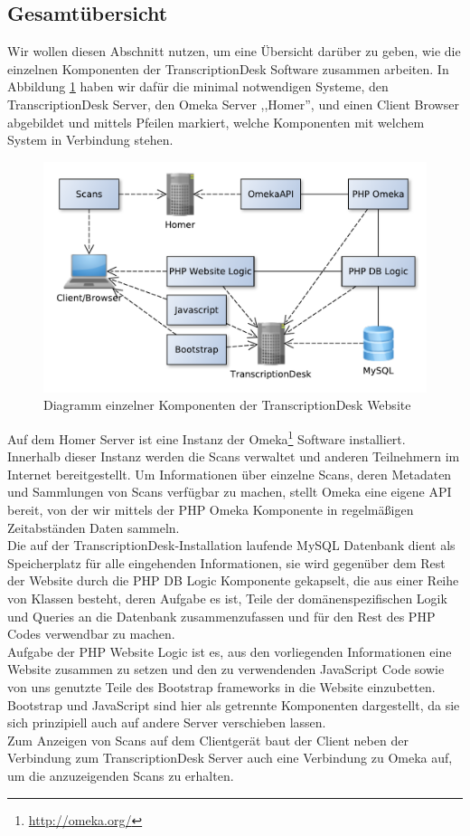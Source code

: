 \documentclass{article}
\begin{document}
\subsection{Gesamtübersicht}
Wir wollen diesen Abschnitt nutzen, um eine Übersicht darüber zu geben,
wie die einzelnen Komponenten der TranscriptionDesk Software zusammen arbeiten.
In Abbildung \ref{fig:components} haben wir dafür die minimal notwendigen Systeme,
den TranscriptionDesk Server, den Omeka Server ,,Homer'', und einen Client Browser abgebildet
und mittels Pfeilen markiert, welche Komponenten mit welchem System in Verbindung stehen.
\\\begin{figure}[H]
\includegraphics[width=\textwidth]{../notes/components.pdf}
\caption{Diagramm einzelner Komponenten der TranscriptionDesk Website}
\label{fig:components}
\end{figure}
Auf dem Homer Server ist eine Instanz der Omeka\footnote{\url{http://omeka.org/}} Software installiert.
Innerhalb dieser Instanz werden die Scans verwaltet und anderen Teilnehmern im Internet bereitgestellt.
Um Informationen über einzelne Scans, deren Metadaten und Sammlungen von Scans verfügbar zu machen,
stellt Omeka eine eigene API bereit, von der wir mittels der PHP Omeka Komponente in regelmäßigen Zeitabständen Daten sammeln.\\
Die auf der TranscriptionDesk-Installation laufende MySQL Datenbank dient als Speicherplatz für alle eingehenden Informationen,
sie wird gegenüber dem Rest der Website durch die PHP DB Logic Komponente gekapselt,
die aus einer Reihe von Klassen besteht, deren Aufgabe es ist,
Teile der domänenspezifischen Logik und Queries an die Datenbank zusammenzufassen
und für den Rest des PHP Codes verwendbar zu machen.\\
Aufgabe der PHP Website Logic ist es, aus den vorliegenden Informationen eine Website zusammen zu setzen
und den zu verwendenden JavaScript Code sowie von uns genutzte Teile des Bootstrap frameworks in die Website einzubetten.
Bootstrap und JavaScript sind hier als getrennte Komponenten dargestellt,
da sie sich prinzipiell auch auf andere Server verschieben lassen.\\
Zum Anzeigen von Scans auf dem Clientgerät baut der Client neben der Verbindung zum TranscriptionDesk Server auch eine Verbindung zu Omeka auf,
um die anzuzeigenden Scans zu erhalten.
\end{document}
